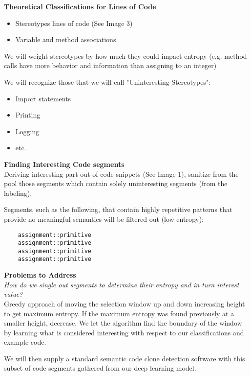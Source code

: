 \documentclass{article}
\begin{document}
    \textbf{Theoretical Classifications for Lines of Code}
    \begin{itemize}
        \item Stereotypes lines of code (See Image 3)
        \item Variable and method associations
    \end{itemize}
    We will weight stereotypes by how much they could impact entropy (e.g. method calls have more behavior and information than assigning to an integer)

    We will recognize those that we will call "Uninteresting Stereotypes":
    \begin{itemize}
        \item Import statements
        \item Printing
        \item Logging
        \item etc.
    \end{itemize}

    \textbf{Finding Interesting Code segments}\\
    Deriving interesting part out of code snippets (See Image 1), sanitize from the pool those segments which contain solely uninteresting segments (from the labeling).

    Segments, such as the following, that contain highly repetitive patterns that provide no meaningful semantics will be filtered out (low entropy):
    \begin{lstlisting}
    assignment::primitive
    assignment::primitive
    assignment::primitive
    assignment::primitive
    \end{lstlisting}
    \textbf{Problems to Address}\\
    \textit{How do we single out segments to determine their entropy and in turn interest value?}\\
    Greedy approach of moving the selection window up and down increasing height to get maximum entropy. If the maximum entropy was found previously at a smaller height, decrease.
    We let the algorithm find the boundary of the window by learning what is considered interesting with respect to our classifications and example code.

    We will then supply a standard semantic code clone detection software with this subset of code segments gathered from our deep learning model.
\end{document}
